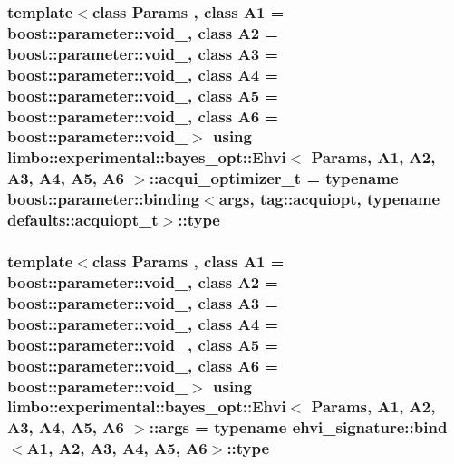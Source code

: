 \subsubsection[{\texorpdfstring{acqui\+\_\+optimizer\+\_\+t}{acqui_optimizer_t}}]{\setlength{\rightskip}{0pt plus 5cm}template$<$class Params , class A1  = boost\+::parameter\+::void\+\_\+, class A2  = boost\+::parameter\+::void\+\_\+, class A3  = boost\+::parameter\+::void\+\_\+, class A4  = boost\+::parameter\+::void\+\_\+, class A5  = boost\+::parameter\+::void\+\_\+, class A6  = boost\+::parameter\+::void\+\_\+$>$ using {\bf limbo\+::experimental\+::bayes\+\_\+opt\+::\+Ehvi}$<$ Params, A1, A2, A3, A4, A5, A6 $>$\+::{\bf acqui\+\_\+optimizer\+\_\+t} =  typename boost\+::parameter\+::binding$<${\bf args}, tag\+::acquiopt, typename {\bf defaults\+::acquiopt\+\_\+t}$>$\+::type}\hypertarget{classlimbo_1_1experimental_1_1bayes__opt_1_1_ehvi_a981a7ea28359721ff4a0c26d6d99a6c7}{}\label{classlimbo_1_1experimental_1_1bayes__opt_1_1_ehvi_a981a7ea28359721ff4a0c26d6d99a6c7}
\subsubsection[{\texorpdfstring{args}{args}}]{\setlength{\rightskip}{0pt plus 5cm}template$<$class Params , class A1  = boost\+::parameter\+::void\+\_\+, class A2  = boost\+::parameter\+::void\+\_\+, class A3  = boost\+::parameter\+::void\+\_\+, class A4  = boost\+::parameter\+::void\+\_\+, class A5  = boost\+::parameter\+::void\+\_\+, class A6  = boost\+::parameter\+::void\+\_\+$>$ using {\bf limbo\+::experimental\+::bayes\+\_\+opt\+::\+Ehvi}$<$ Params, A1, A2, A3, A4, A5, A6 $>$\+::{\bf args} =  typename ehvi\+\_\+signature\+::bind$<$A1, A2, A3, A4, A5, A6$>$\+::type}\hypertarget{classlimbo_1_1experimental_1_1bayes__opt_1_1_ehvi_a58d9809d76f0efc94ec9ec7a815e967b}{}\label{classlimbo_1_1experimental_1_1bayes__opt_1_1_ehvi_a58d9809d76f0efc94ec9ec7a815e967b}
